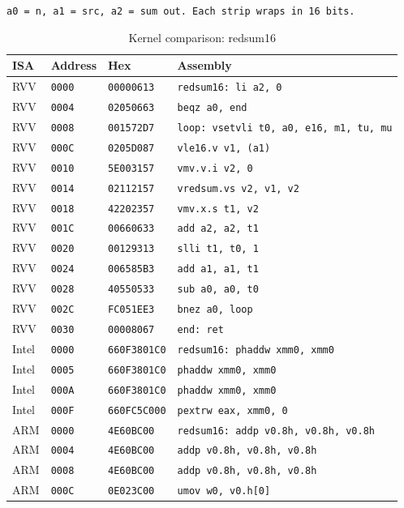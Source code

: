 \begin{table}[htbp]
\centering
\caption{Kernel comparison: redsum16}
\begingroup
\scriptsize
\setlength{\tabcolsep}{4pt}
\noindent \texttt{a0 = n, a1 = src, a2 = sum out. Each strip wraps in 16 bits.}\par
\vspace{0.6ex}
\begin{tabular}{@{}l|l|l|p{7.2cm}@{}}
\toprule
ISA & Address & Hex & Assembly \\
\midrule
RVV & \texttt{0000} & \texttt{00000613} & \texttt{redsum16: li a2, 0} \\
RVV & \texttt{0004} & \texttt{02050663} & \texttt{beqz a0, end} \\
RVV & \texttt{0008} & \texttt{001572D7} & \texttt{loop: vsetvli t0, a0, e16, m1, tu, mu} \\
RVV & \texttt{000C} & \texttt{0205D087} & \texttt{vle16.v v1, (a1)} \\
RVV & \texttt{0010} & \texttt{5E003157} & \texttt{vmv.v.i v2, 0} \\
RVV & \texttt{0014} & \texttt{02112157} & \texttt{vredsum.vs v2, v1, v2} \\
RVV & \texttt{0018} & \texttt{42202357} & \texttt{vmv.x.s t1, v2} \\
RVV & \texttt{001C} & \texttt{00660633} & \texttt{add a2, a2, t1} \\
RVV & \texttt{0020} & \texttt{00129313} & \texttt{slli t1, t0, 1} \\
RVV & \texttt{0024} & \texttt{006585B3} & \texttt{add a1, a1, t1} \\
RVV & \texttt{0028} & \texttt{40550533} & \texttt{sub a0, a0, t0} \\
RVV & \texttt{002C} & \texttt{FC051EE3} & \texttt{bnez a0, loop} \\
RVV & \texttt{0030} & \texttt{00008067} & \texttt{end: ret} \\
\midrule
Intel & \texttt{0000} & \texttt{660F3801C0} & \texttt{redsum16: phaddw xmm0, xmm0} \\
Intel & \texttt{0005} & \texttt{660F3801C0} & \texttt{phaddw xmm0, xmm0} \\
Intel & \texttt{000A} & \texttt{660F3801C0} & \texttt{phaddw xmm0, xmm0} \\
Intel & \texttt{000F} & \texttt{660FC5C000} & \texttt{pextrw eax, xmm0, 0} \\
\midrule
ARM & \texttt{0000} & \texttt{4E60BC00} & \texttt{redsum16: addp v0.8h, v0.8h, v0.8h} \\
ARM & \texttt{0004} & \texttt{4E60BC00} & \texttt{addp v0.8h, v0.8h, v0.8h} \\
ARM & \texttt{0008} & \texttt{4E60BC00} & \texttt{addp v0.8h, v0.8h, v0.8h} \\
ARM & \texttt{000C} & \texttt{0E023C00} & \texttt{umov w0, v0.h[0]} \\
\bottomrule
\end{tabular}
\endgroup
\end{table}
\noindent{}\par
